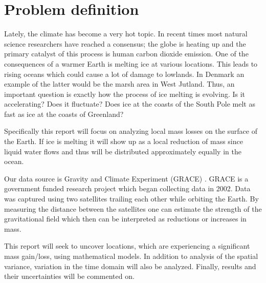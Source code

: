 \section{Problem definition}
Lately, the climate has become a very hot topic. 
In recent times most natural science researchers have reached a consensus;
the globe is heating up and the primary catalyst of this process is human carbon dioxide emission.
One of the consequences of a warmer Earth is melting ice at various locations.
This leads to rising oceans which could cause a lot of damage to lowlands.
In Denmark an example of the latter would be the marsh area in West Jutland.
Thus, an important question is exactly how the process of ice melting is evolving. 
Is it accelerating? Does it fluctuate? Does ice at the coasts of the South Pole melt as fast as ice at the coasts of Greenland?

Specifically this report will focus on analyzing local mass losses on the surface of the Earth.
If ice is melting it will show up as a local reduction of mass since liquid water flows and thus will be distributed approximately equally in the ocean. 

Our data source is Gravity and Climate Experiment (GRACE) \cite{GRACE-data-source}. 
GRACE is a government funded research project which began collecting data in 2002.
Data was captured using two satellites trailing each other while orbiting the Earth.
By measuring the distance between the satellites one can estimate the strength of the gravitational field which then can be interpreted as reductions or increases in mass.

This report will seek to uncover locations, which are experiencing a significant mass gain/loss, using mathematical models. 
In addition to analysis of the spatial variance, variation in the time domain will also be analyzed.
Finally, results and their uncertainties will be commented on.
